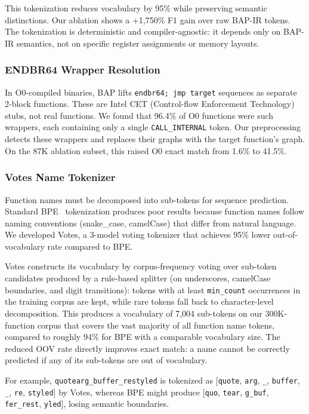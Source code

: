 \documentclass[sigconf,nonacm]{acmart}
\begin{document}
This tokenization reduces vocabulary by 95\% while preserving semantic distinctions. Our ablation shows a +1,750\% F1 gain over raw BAP-IR tokens. The tokenization is deterministic and compiler-agnostic: it depends only on BAP-IR semantics, not on specific register assignments or memory layouts.

\subsubsection{ENDBR64 Wrapper Resolution}

In O0-compiled binaries, BAP lifts \texttt{endbr64; jmp target} sequences as separate 2-block functions. These are Intel CET (Control-flow Enforcement Technology) stubs, not real functions. We found that 96.4\% of O0 functions were such wrappers, each containing only a single \texttt{CALL\_INTERNAL} token. Our preprocessing detects these wrappers and replaces their graphs with the target function's graph. On the 87K ablation subset, this raised O0 exact match from 1.6\% to 41.5\%.

\subsubsection{Votes Name Tokenizer}
\label{sec:votes}

Function names must be decomposed into sub-tokens for sequence prediction. Standard BPE~\cite{bpe} tokenization produces poor results because function names follow naming conventions (snake\_case, camelCase) that differ from natural language. We developed Votes, a 3-model voting tokenizer that achieves 95\% lower out-of-vocabulary rate compared to BPE.

Votes constructs its vocabulary by corpus-frequency voting over sub-token candidates produced by a rule-based splitter (on underscores, camelCase boundaries, and digit transitions): tokens with at least \texttt{min\_count} occurrences in the training corpus are kept, while rare tokens fall back to character-level decomposition. This produces a vocabulary of 7{,}004 sub-tokens on our 300K-function corpus that covers the vast majority of all function name tokens, compared to roughly 94\% for BPE with a comparable vocabulary size. The reduced OOV rate directly improves exact match: a name cannot be correctly predicted if any of its sub-tokens are out of vocabulary.

For example, \texttt{quotearg\_buffer\_restyled} is tokenized as [\texttt{quote}, \texttt{arg}, \texttt{\_}, \texttt{buffer}, \texttt{\_}, \texttt{re}, \texttt{styled}] by Votes, whereas BPE might produce [\texttt{quo}, \texttt{tear}, \texttt{g\_buf}, \texttt{fer\_rest}, \texttt{yled}], losing semantic boundaries.
\end{document}
